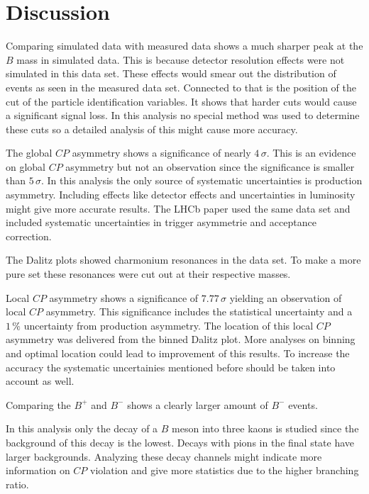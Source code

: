 \section{Discussion}
\label{sec:Diskussion}
Comparing simulated data with measured data shows a much sharper peak at the $B$ mass in simulated data.
This is because detector resolution effects were not simulated in this data set.
These effects would smear out the distribution of events as seen in the measured data set.
Connected to that is the position of the cut of the particle identification variables.
It shows that harder cuts would cause a significant signal loss.
In this analysis no special method was used to determine these cuts so a detailed analysis of this might cause more accuracy.

The global $C\!P$ asymmetry shows a significance of nearly $4\,\sigma$.
This is an evidence on global $C\!P$ asymmetry but not an observation since the significance is smaller than $5\,\sigma$.
In this analysis the only source of systematic uncertainties is production asymmetry.
Including effects like detector effects and uncertainties in luminosity might give more accurate results.
The LHCb paper \cite{paper} used the same data set and included systematic uncertainties in trigger asymmetrie and acceptance correction.

The Dalitz plots showed charmonium resonances in the data set.
To make a more pure set these resonances were cut out at their respective masses.

Local $C\!P$ asymmetry shows a significance of $7.77\,\sigma$ yielding an observation of local $C\!P$ asymmetry.
This significance includes the statistical uncertainty and a $1\,\%$ uncertainty from production asymmetry.
The location of this local $C\!P$ asymmetry was delivered from the binned Dalitz plot.
More analyses on binning and optimal location could lead to improvement of this results.
To increase the accuracy the systematic uncertainies mentioned before should be taken into account as well.

Comparing the $B^+$ and $B^-$ shows a clearly larger amount of $B^-$ events.

In this analysis only the decay of a $B$ meson into three kaons is studied since the background of this decay is the lowest.
Decays with pions in the final state have larger backgrounds.
Analyzing these decay channels might indicate more information on $C\!P$ violation and give more statistics due to the higher branching ratio.
